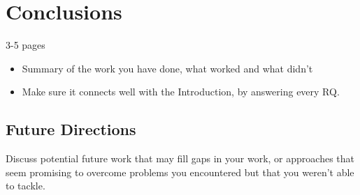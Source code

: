 
\chapter{Conclusions}
\label{ch:conclusion}
3-5 pages
\begin{itemize}
    \item Summary of the work you have done, what worked and what didn't
    \item Make sure it connects well with the Introduction, by answering every RQ.
\end{itemize}

\section{Future Directions}
Discuss potential future work that may fill gaps in your work, or approaches that seem promising to overcome problems you encountered but that you weren't able to tackle.